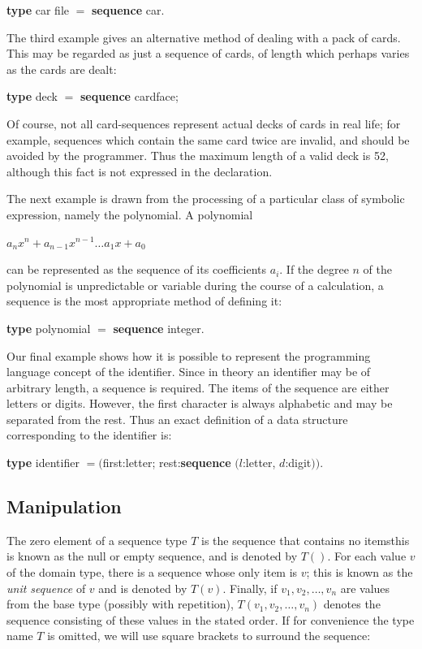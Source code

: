 \documentclass[twoside,11pt]{book}
\begin{document}
\quad \textbf{type} car file $=$ \textbf{sequence} car.

The third example gives an alternative method of dealing with a pack of cards. This may be regarded as just a sequence of cards, of length which perhaps varies as the cards are dealt:

\quad \textbf{type} deck $=$ \textbf{sequence} cardface;

\noindent
Of course, not all card-sequences represent actual decks of cards in real life; for example, sequences which contain the same card twice are invalid, and should be avoided by the programmer. Thus the maximum length of a valid deck is 52, although this fact is not expressed in the declaration.

The next example is drawn from the processing of a particular class of symbolic expression, namely the polynomial. A polynomial

$a_n x^n + a_{n-1}x^{n-1}\dots a_1 x + a_0$

\noindent
can be represented as the sequence of its coefficients $a_i$. If the degree $n$ of the polynomial is unpredictable or variable during the course of a calculation, a sequence is the most appropriate method of defining it:

\quad \textbf{type} polynomial $=$ \textbf{sequence} integer.

Our final example shows how it is possible to represent the programming language concept of the identifier. Since in theory an identifier may be of arbitrary length, a sequence is required. The items of the sequence are either letters or digits. However, the first character is always alphabetic and may be separated from the rest. Thus an exact definition of a data structure corresponding to the identifier is:

\quad \textbf{type} identifier $= ($first:letter; rest:\textbf{sequence} $(l$:letter, $d$:digit$))$.

\subsection{Manipulation}

The zero element of a sequence type $T$ is the sequence that contains no items\textemdash{}this is known as the null or empty sequence, and is denoted by $T()$. For each value $v$ of the domain type, there is a sequence whose only item is $v$; this is known as the \textit{unit sequence} of $v$ and is denoted by $T(v)$. Finally, if $v_1, v_2, \dots, v_n$ are values from the base type (possibly with repetition),
$T(v_1, v_2, \dots, v_n)$ denotes the sequence consisting of these values in the stated order. If for convenience the type name $T$ is omitted, we will use square brackets to surround the sequence:
\end{document}
